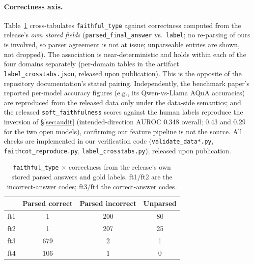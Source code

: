 \documentclass[11pt]{article}
\begin{document}
\paragraph{Correctness axis.} Table~\ref{tab:crosstab} cross-tabulates \texttt{faithful\_type} against correctness computed from the release's \emph{own stored fields} (\texttt{parsed\_final\_answer} vs.\ \texttt{label}; no re-parsing of ours is involved, so parser agreement is not at issue; unparseable entries are shown, not dropped). The association is near-deterministic and holds within each of the four domains separately (per-domain tables in the artifact \texttt{label\_crosstabs.json}, released upon publication). This is the opposite of the repository documentation's stated pairing. Independently, the benchmark paper's reported per-model accuracy figures (e.g., its Qwen-vs-Llama AQuA accuracies) are reproduced from the released data only under the data-side semantics; and the released \texttt{soft\_faithfulness} scores against the human labels reproduce the inversion of \S\ref{sec:audit} (intended-direction AUROC 0.348 overall; 0.43 and 0.29 for the two open models), confirming our feature pipeline is not the source. All checks are implemented in our verification code (\texttt{validate\_data*.py}, \texttt{faithcot\_reproduce.py}, \texttt{label\_crosstabs.py}), released upon publication.

\begin{table}[h]
\centering
\small
\begin{tabular}{@{}lccc@{}}
\toprule
 & \textbf{Parsed correct} & \textbf{Parsed incorrect} & \textbf{Unparsed} \\
\midrule
ft1 & 1 & 200 & 80 \\
ft2 & 1 & 207 & 25 \\
ft3 & 679 & 2 & 1 \\
ft4 & 106 & 1 & 0 \\
\bottomrule
\end{tabular}
\caption{\texttt{faithful\_type} $\times$ correctness from the release's own stored parsed answers and gold labels. ft1/ft2 are the incorrect-answer codes; ft3/ft4 the correct-answer codes.}
\label{tab:crosstab}
\end{table}
\end{document}
